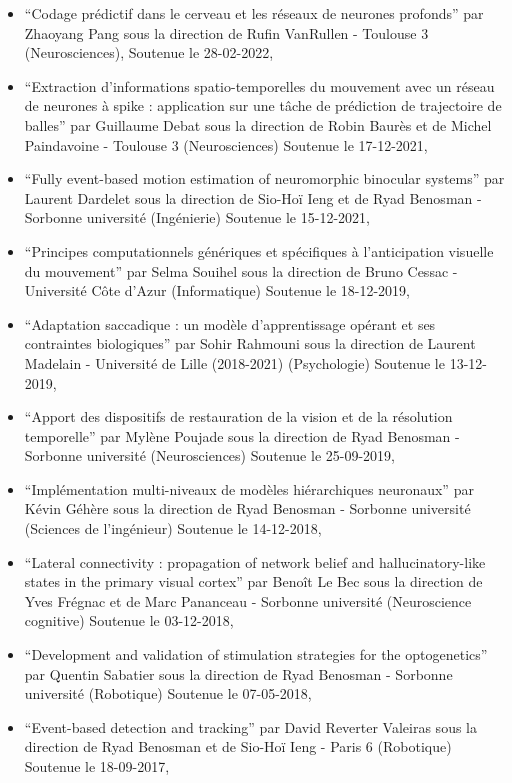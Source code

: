\documentclass[10pt,french,a4paper,oneside]{article}%
\begin{document}
\begin{itemize}
	\item ``Codage prédictif dans le cerveau et les réseaux de neurones profonds'' 	par Zhaoyang Pang sous la direction de Rufin VanRullen - Toulouse 3 (Neurosciences), Soutenue le 28-02-2022,
	\item ``Extraction d'informations spatio-temporelles du mouvement avec un réseau de neurones à spike : application sur une tâche de prédiction de trajectoire de balles'' par Guillaume Debat sous la direction de Robin Baurès et de Michel Paindavoine - Toulouse 3  (Neurosciences) 	Soutenue le 17-12-2021,
	\item ``Fully event-based motion estimation of neuromorphic binocular systems'' par Laurent Dardelet sous la direction de Sio-Hoï Ieng et de Ryad Benosman - Sorbonne université (Ingénierie) Soutenue le 15-12-2021,
	\item ``Principes computationnels génériques et spécifiques à l’anticipation visuelle du mouvement'' par Selma Souihel sous la direction de Bruno Cessac - Université Côte d'Azur (Informatique) Soutenue le 18-12-2019,
	\item ``Adaptation saccadique : un modèle d’apprentissage opérant et ses contraintes biologiques'' par Sohir Rahmouni sous la direction de Laurent Madelain - Université de Lille (2018-2021)
	(Psychologie) Soutenue le 13-12-2019,
	\item ``Apport des dispositifs de restauration de la vision et de la résolution temporelle''  par Mylène Poujade sous la direction de Ryad Benosman - Sorbonne université	(Neurosciences) 	Soutenue le 25-09-2019,
	\item ``Implémentation multi-niveaux de modèles hiérarchiques neuronaux'' par Kévin Géhère sous la direction de Ryad Benosman - Sorbonne université 	(Sciences de l'ingénieur) Soutenue le 14-12-2018,
	\item ``Lateral connectivity : propagation of network belief and hallucinatory-like states in the primary visual cortex'' par Benoît Le Bec sous la direction de Yves Frégnac et de Marc Pananceau - Sorbonne université (Neuroscience cognitive) Soutenue le 03-12-2018,
	\item ``Development and validation of stimulation strategies for the optogenetics'' par Quentin Sabatier sous la direction de Ryad Benosman - Sorbonne université (Robotique) Soutenue le 07-05-2018,
	\item ``Event-based detection and tracking'' par David Reverter Valeiras sous la direction de Ryad Benosman et de Sio-Hoï Ieng - Paris 6	(Robotique)	Soutenue le 18-09-2017,

\end{itemize}
\end{document}
